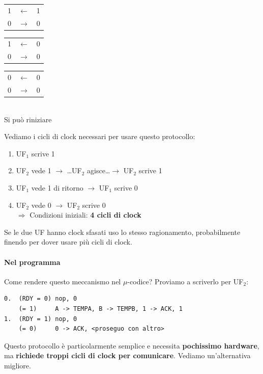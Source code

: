 \documentclass[10pt]{report}
\begin{document}
\begin{list}{}{}
\begin{multicols}{4}
\begin{center}
\begin{tabular}{ c c c }
		\end{tabular}
		\end{center}
		\columnbreak
		\begin{center}
		\begin{tabular}{ c c c }
			 1 & $\longleftarrow$ & 1 \\ 
			 0 & $\longrightarrow$ & 0
		\end{tabular}
		\end{center}
		\columnbreak
		\begin{center}
		\begin{tabular}{ c c c }
			 1 & $\longleftarrow$ & 0 \\ 
			 0 & $\longrightarrow$ & 0
		\end{tabular}
		\end{center}
		\columnbreak
		\begin{center}
		\begin{tabular}{ c c c }
			 0 & $\longleftarrow$ & 0 \\ 
			 0 & $\longrightarrow$ & 0
		\end{tabular}\\
		Si può riniziare
		\end{center}
	\end{multicols}
\end{list}
Vediamo i cicli di clock necessari per usare questo protocollo:
\begin{enumerate}
	\item UF$_1$ scrive 1
	\item UF$_2$ vede 1 $\rightarrow$ \ldots UF$_2$ agisce\ldots $\rightarrow$ UF$_2$ scrive 1
	\item UF$_1$ vede 1 di ritorno $\rightarrow$ UF$_1$ scrive 0
	\item UF$_2$ vede 0 $\rightarrow$ UF$_2$ scrive 0\\
	$\Rightarrow$ Condizioni iniziali: \textbf{4 cicli di clock}
\end{enumerate}
Se le due UF hanno clock sfasati uso lo stesso ragionamento, probabilmente finendo per dover usare più cicli di clock.
\paragraph{Nel programma} Come rendere questo meccanismo nel $\mu$-codice? Proviamo a scriverlo per UF$_2$:
\begin{lstlisting}
0.  (RDY = 0) nop, 0
    (= 1)     A -> TEMPA, B -> TEMPB, 1 -> ACK, 1
1.  (RDY = 1) nop, 0
    (= 0)     0 -> ACK, <proseguo con altro>
\end{lstlisting}
\pagebreak
Questo protocollo è particolarmente semplice e necessita \textbf{pochissimo hardware}, ma \textbf{richiede troppi cicli di clock per comunicare}. Vediamo un'alternativa migliore.
\end{document}
